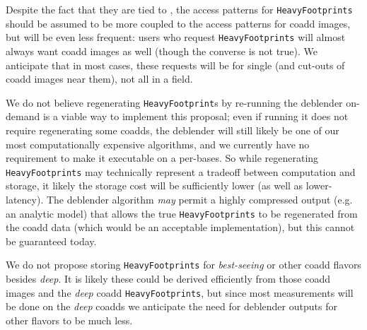 \documentclass[DM,lsstdraft,toc]{lsstdoc}
\begin{document}
Despite the fact that they are tied to \Objects, the access patterns for \texttt{HeavyFootprints} should be assumed to be more coupled to the access patterns for coadd images, but will be even less frequent: users who request \texttt{HeavyFootprints} will almost always want coadd images as well (though the converse is not true).  We anticipate that in most cases, these requests will be for single \Objects (and cut-outs of coadd images near them), not all \Objects in a field.

We do not believe regenerating \texttt{HeavyFootprint}s by re-running the deblender on-demand is a viable way to implement this proposal; even if running it does not require regenerating some coadds, the deblender will still likely be one of our most computationally expensive algorithms, and we currently have no requirement to make it executable on a per-\Object bases.  So while regenerating \texttt{HeavyFootprints} may technically represent a tradeoff between computation and storage, it likely the storage cost will be sufficiently lower (as well as lower-latency).  The deblender algorithm \emph{may} permit a highly compressed output (e.g. an analytic model) that allows the true \texttt{HeavyFootprints} to be regenerated from the coadd data (which would be an acceptable implementation), but this cannot be guaranteed today.

We do not propose storing \texttt{HeavyFootprints} for \emph{best-seeing} or other coadd flavors besides \emph{deep}.  It is likely these could be derived efficiently from those coadd images and the \emph{deep} coadd \texttt{HeavyFootprints}, but since most measurements will be done on the \emph{deep} coadds we anticipate the need for deblender outputs for other flavors to be much less.
\end{document}
